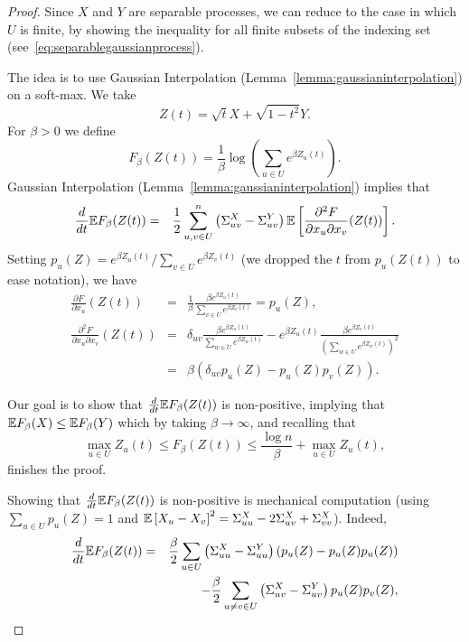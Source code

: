 \begin{proof}
Since $X$ and $Y$ are separable processes, we can reduce to the case in which $U$ is finite, by showing the inequality for all finite subsets of the indexing set (see~\eqref{eq:separablegaussianprocess}).

The idea is to use Gaussian Interpolation (Lemma~\ref{lemma:gaussianinterpolation}) on a soft-max. We take
\[
Z(t) = \sqrt{t}X + \sqrt{1-t^2}Y.
\]
For $\beta>0$ we define
\[
F_\beta(Z(t)) = \frac{1}{\beta} \log\left(\sum_{u\in U} e^{\beta Z_u(t)} \right). 
\]
Gaussian Interpolation (Lemma~\ref{lemma:gaussianinterpolation}) implies that
\begin{eqnarray*}
\frac{d}{dt}\mathbb{E} F_\beta(Z(t)) &=&  \frac12 \sum_{u,v\in U}^n \left( \Sigma^X_{uv} - \Sigma^Y_{uv} \right) \mathbb{E} \left[ \frac{\partial^2 F}{\partial x_u\partial x_v}(Z(t))\right].
\end{eqnarray*}
Setting $p_u(Z) = e^{\beta Z_u(t)} / \sum_{v\in U} e^{\beta Z_v(t)}$ (we dropped the $t$ from $p_u(Z(t))$ to ease notation), we have
\begin{eqnarray*}
\frac{\partial F}{\partial x_u}(Z(t)) & = & \frac{1}{\beta}  \frac{\beta e^{\beta Z_u(t)} }{\sum_{v\in U} e^{\beta Z_v(t)}} = p_u(Z), \\ \frac{\partial^2 F}{\partial x_u\partial x_v}(Z(t)) & = & \delta_{uv} \frac{\beta e^{\beta Z_u(t)} }{\sum_{w\in U} e^{\beta Z_w(t)}} - e^{\beta Z_u(t)}\frac{\beta e^{\beta Z_v(t)}  }{\left(\sum_{w\in U} e^{\beta Z_w(t)}\right)^2} \\ & = & \beta\left( \delta_{uv}p_u(Z) - p_u(Z)p_v(Z)  \right).
\end{eqnarray*}

Our goal is to show that $\frac{d}{dt}\mathbb{E} F_\beta(Z(t))$ is non-positive, implying that $\mathbb{E} F_\beta(X) \leq \mathbb{E} F_\beta(Y)$ which by taking $\beta\to\infty$, and recalling that $$\max_{u\in U}Z_u(t) \leq F_\beta(Z(t)) \leq \frac{\log n}{\beta} + \max_{u\in U}Z_u(t),$$ finishes the proof.

Showing that $\frac{d}{dt}\mathbb{E} F_\beta(Z(t))$ is non-positive is mechanical computation (using $\sum_{u\in U}p_u(Z)=1$ and $\mathbb{E}\left[X_{u}-X_{v}\right]^2 = \Sigma^X_{uu}-2\Sigma^X_{uv}+\Sigma^X_{vv}$). Indeed,
\begin{eqnarray}
\frac{d}{dt}\mathbb{E} F_\beta(Z(t)) &=& \frac{\beta}{2}\sum_{u\in U} \left( \Sigma^X_{uu} - \Sigma^Y_{uu} \right)\left( p_u(Z) - p_u(Z)p_u(Z)  \right)
 \\ & &  - \frac{\beta}{2}\sum_{u\neq v\in U} \left( \Sigma^X_{uv} - \Sigma^Y_{uv} \right) p_u(Z)p_v(Z),
\end{eqnarray}


\end{proof}
